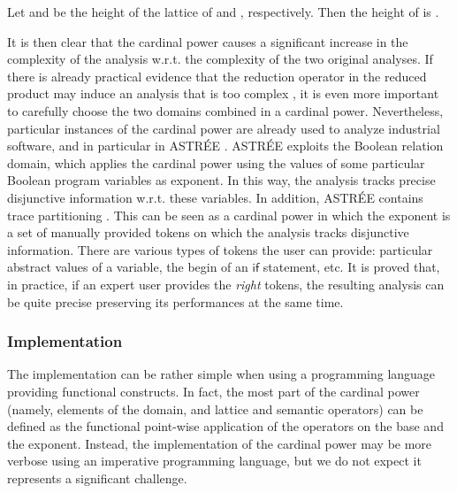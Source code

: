 \documentclass[submission,copyright,creativecommons]{eptcs}
\newcommand{\statement}[1]{\ensuremath{\mathsf{#1}}}
\begin{document}
Let  and  be the height of the lattice of  and , respectively. Then the height of  is .

It is then clear that the cardinal power causes a significant increase in the complexity of the analysis w.r.t. the complexity of the two original analyses. If there is already practical evidence that the reduction operator in the reduced product may induce an analysis that is too complex \cite{LOG08}, it is even more important to carefully choose the two domains combined in a cardinal power. Nevertheless, particular instances of the cardinal power are already used to analyze industrial software, and in particular in ASTR\'EE \cite{BCC03}. ASTR\'EE exploits the Boolean relation domain, which applies the cardinal power using the values of some particular Boolean program variables as exponent. In this way, the analysis tracks precise disjunctive information w.r.t. these variables. In addition, ASTR\'EE contains trace partitioning \cite{MR05}. This can be seen as a cardinal power in which the exponent is a set of manually provided tokens on which the analysis tracks disjunctive information. There are various types of tokens the user can provide: particular abstract values of a variable, the begin of an \statement{if} statement, etc. It is proved that, in practice, if an expert user provides the \emph{right} tokens, the resulting analysis can be quite precise preserving its performances at the same time.

\subsubsection{Implementation}
The implementation can be rather simple when using a programming language providing functional constructs. In fact, the most part of the cardinal power (namely, elements of the domain, and lattice and semantic operators) can be defined as the functional point-wise application of the operators on the base and the exponent. Instead, the implementation of the cardinal power may be more verbose using an imperative programming language, but we do not expect it represents a significant challenge.
\end{document}

